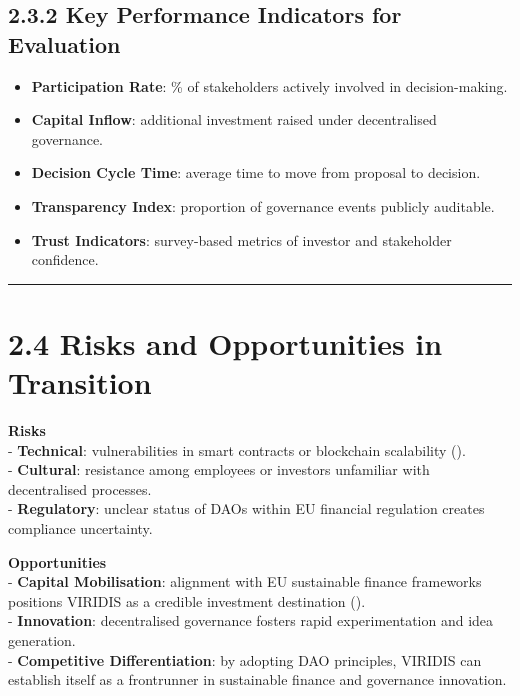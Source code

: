 \documentclass[
  english,
  12pt,
  oneside,
  open=any]{scrbook}
\providecommand{\tightlist}{%
  \setlength{\itemsep}{0pt}\setlength{\parskip}{0pt}}\usepackage{longtable,booktabs,array}
\begin{document}
\subsection{2.3.2 Key Performance Indicators for
Evaluation}\label{sec-kpis}

\begin{itemize}
\tightlist
\item
  \textbf{Participation Rate}: \% of stakeholders actively involved in
  decision-making.\\
\item
  \textbf{Capital Inflow}: additional investment raised under
  decentralised governance.\\
\item
  \textbf{Decision Cycle Time}: average time to move from proposal to
  decision.\\
\item
  \textbf{Transparency Index}: proportion of governance events publicly
  auditable.\\
\item
  \textbf{Trust Indicators}: survey-based metrics of investor and
  stakeholder confidence.
\end{itemize}

\begin{center}\rule{0.5\linewidth}{0.5pt}\end{center}

\section{2.4 Risks and Opportunities in Transition}\label{sec-risks}

\textbf{Risks}\\
- \textbf{Technical}: vulnerabilities in smart contracts or blockchain
scalability ().\\
- \textbf{Cultural}: resistance among employees or investors unfamiliar
with decentralised processes.\\
- \textbf{Regulatory}: unclear status of DAOs within EU financial
regulation creates compliance uncertainty.

\textbf{Opportunities}\\
- \textbf{Capital Mobilisation}: alignment with EU sustainable finance
frameworks positions VIRIDIS as a credible investment destination
().\\
- \textbf{Innovation}: decentralised governance fosters rapid
experimentation and idea generation.\\
- \textbf{Competitive Differentiation}: by adopting DAO principles,
VIRIDIS can establish itself as a frontrunner in sustainable finance and
governance innovation.
\end{document}
